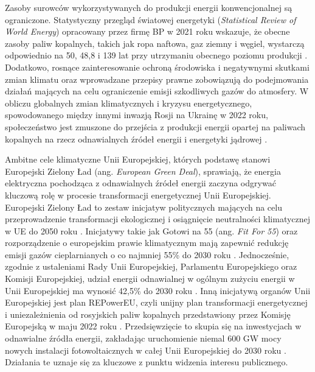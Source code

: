 \documentclass{amuthesis}
\begin{document}
Zasoby surowców wykorzystywanych do produkcji energii konwencjonalnej są
ograniczone. Statystyczny przegląd światowej energetyki
(\emph{Statistical Review of World Energy}) opracowany przez firmę BP w
2021 roku wskazuje, że obecne zasoby paliw kopalnych, takich jak ropa
naftowa, gaz ziemny i węgiel, wystarczą odpowiednio na 50, 48,8 i 139
lat przy utrzymaniu obecnego poziomu produkcji
\autocite{bp_2021_world_energy}. Dodatkowo, rosnące zainteresowanie
ochroną środowiska i negatywnymi skutkami zmian klimatu oraz wprowadzane
przepisy prawne zobowiązują do podejmowania działań mających na celu
ograniczenie emisji szkodliwych gazów do atmosfery. W obliczu globalnych
zmian klimatycznych i kryzysu energetycznego, spowodowanego między
innymi inwazją Rosji na Ukrainę w 2022 roku, społeczeństwo jest zmuszone
do przejścia z produkcji energii opartej na paliwach kopalnych na rzecz
odnawialnych źródeł energii i energetyki jądrowej
\autocite{iea2021,iea2022}.

Ambitne cele klimatyczne Unii Europejskiej, których podstawę stanowi
Europejski Zielony Ład (ang. \emph{European Green Deal}), sprawiają, że
energia elektryczna pochodząca z odnawialnych źródeł energii zaczyna
odgrywać kluczową rolę w procesie transformacji energetycznej Unii
Europejskiej. Europejski Zielony Ład to zestaw inicjatyw politycznych
mających na celu przeprowadzenie transformacji ekologicznej i
osiągnięcie neutralności klimatycznej w UE do 2050 roku
\autocite{european_green_deal}. Inicjatywy takie jak Gotowi na 55 (ang.
\emph{Fit For 55}) oraz rozporządzenie o europejskim prawie klimatycznym
mają zapewnić redukcję emisji gazów cieplarnianych o co najmniej 55\% do
2030 roku \autocite{european_green_deal}. Jednocześnie, zgodnie z
ustaleniami Rady Unii Europejskiej, Parlamentu Europejskiego oraz
Komisji Europejskiej, udział energii odnawialnej w ogólnym zużyciu
energii w Unii Europejskiej ma wynosić 42,5\% do 2030 roku
\autocite{renewable_energy_eu}. Inną inicjatywą organów Unii
Europejskiej jest plan REPowerEU, czyli unijny plan transformacji
energetycznej i uniezależnienia od rosyjskich paliw kopalnych
przedstawiony przez Komisję Europejską w maju 2022 roku
\autocite{repowerEU2022}. Przedsięwzięcie to skupia się na inwestycjach
w odnawialne źródła energii, zakładając uruchomienie niemal 600 GW mocy
nowych instalacji fotowoltaicznych w całej Unii Europejskiej do 2030
roku \autocite{repowerEU2022}. Działania te uznaje się za kluczowe z
punktu widzenia interesu publicznego.
\end{document}
